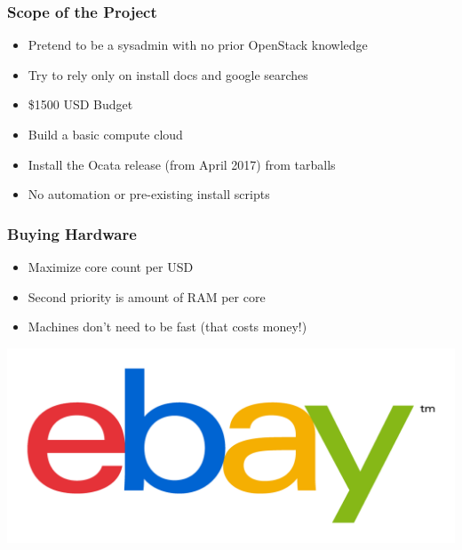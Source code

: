 \documentclass[aspectratio=169,11pt,hyperref={colorlinks=true}]{beamer}
\begin{document}
\begin{frame}
\frametitle{Scope of the Project}
    \begin{itemize}
        \item Pretend to be a sysadmin with no prior OpenStack knowledge
        \item Try to rely only on install docs and google searches
        \item \$1500 USD Budget
        \item Build a basic compute cloud
        \item Install the Ocata release (from April 2017) from tarballs
        \item No automation or pre-existing install scripts
    \end{itemize}
\end{frame}

\begin{frame}
\frametitle{Buying Hardware}
    \begin{itemize}
        \item Maximize core count per USD
        \item Second priority is amount of RAM per core
        \item Machines don't need to be fast (that costs money!)
    \end{itemize}
\end{frame}

\begin{frame}
    \includegraphics[width=\textwidth]{EBay_logo.png}
\end{frame}
\end{document}
